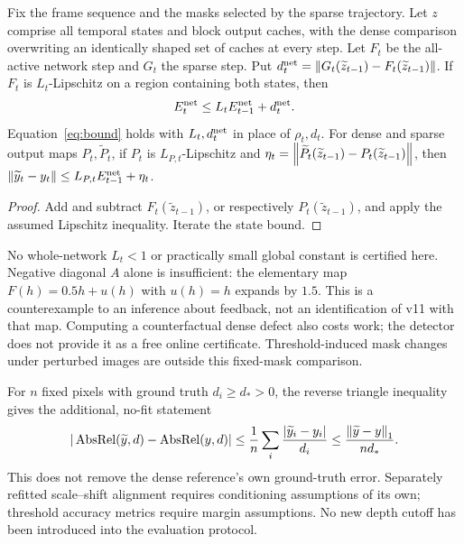 \begin{Theorem}\label{thm:network}
Fix the frame sequence and the masks selected by the sparse trajectory.
Let $z$ comprise all temporal states and block output caches, with the dense
comparison overwriting an identically shaped set of caches at every step.
Let $F_t$ be the all-active network step and $G_t$ the sparse step. Put
$d_t^{\rm net}=\left\lVert G_t(\widetilde z_{t-1})-F_t(\widetilde z_{t-1})\right\rVert$.
If $F_t$ is $L_t$-Lipschitz on a region containing both states, then
\begin{equation}
 E_t^{\rm net}\le L_tE_{t-1}^{\rm net}+d_t^{\rm net}.
\end{equation}
Equation~\eqref{eq:bound} holds with $L_t,d_t^{\rm net}$ in place of
$\rho_t,d_t$. For dense and sparse output maps $P_t,\widetilde P_t$, if
$P_t$ is $L_{P,t}$-Lipschitz and
$\eta_t=\left\lVert\widetilde P_t(\widetilde z_{t-1})-P_t(\widetilde z_{t-1})\right\rVert$,
then $\left\lVert\widetilde y_t-y_t\right\rVert\le L_{P,t}E_{t-1}^{\rm net}+\eta_t$.
\end{Theorem}
\begin{proof}
Add and subtract $F_t(\widetilde z_{t-1})$, or respectively
$P_t(\widetilde z_{t-1})$, and apply the assumed Lipschitz inequality.
Iterate the state bound.
\end{proof}

No whole-network $L_t<1$ or practically small global constant is certified
here. Negative diagonal $A$ alone is insufficient: the elementary map
$F(h)=0.5h+u(h)$ with $u(h)=h$ expands by $1.5$. This is a counterexample
to an inference about feedback, not an identification of v11 with that map.
Computing a counterfactual dense defect also costs work; the detector does
not provide it as a free online certificate. Threshold-induced mask changes
under perturbed images are outside this fixed-mask comparison.

For $n$ fixed pixels with ground truth $d_i\ge d_*>0$, the reverse triangle
inequality gives the additional, no-fit statement
\begin{equation}
 |\operatorname{AbsRel}(\widetilde y,d)-\operatorname{AbsRel}(y,d)|
 \le \frac1n\sum_i\frac{|\widetilde y_i-y_i|}{d_i}
 \le \frac{\left\lVert\widetilde y-y\right\rVert_1}{nd_*}.
\end{equation}
This does not remove the dense reference's own ground-truth error. Separately
refitted scale--shift alignment requires conditioning assumptions of its own;
threshold accuracy metrics require margin assumptions. No new depth cutoff
has been introduced into the evaluation protocol.

